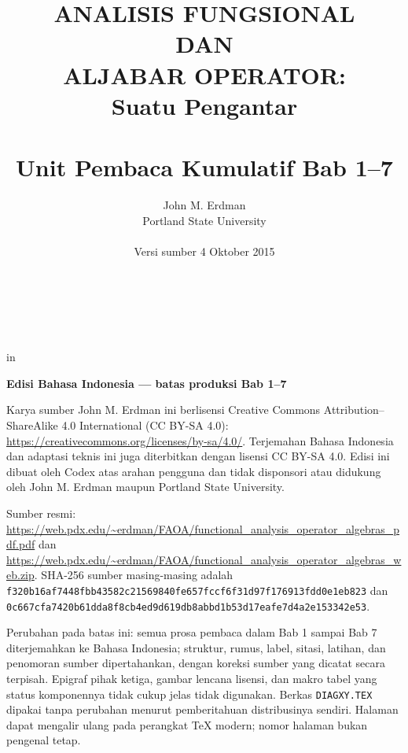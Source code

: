 \documentclass[11pt,reqno]{amsbook}
\theoremstyle{definition}
\theoremstyle{remark}
\numberwithin{equation}{section}
\begin{document}
 \frontmatter
 \title{ANALISIS FUNGSIONAL \\ DAN \\ ALJABAR OPERATOR: \\ Suatu Pengantar \\ \mbox{} \\ \large Unit Pembaca Kumulatif Bab 1--7}
 \author{John M. Erdman \\
      Portland State University \\
      \mbox{\hphantom{P}} \\
      Versi sumber 4 Oktober 2015 \\
      \mbox{\hphantom{P}} \\
      \mbox{\hphantom{P}} \\
            \mbox{\hphantom{P}} \\
                  \mbox{\hphantom{P}} }


 in


\maketitle


\begin{center}
\textbf{Edisi Bahasa Indonesia --- batas produksi Bab 1--7}
\end{center}

Karya sumber John M. Erdman ini berlisensi Creative Commons
Attribution--ShareAlike 4.0 International (CC BY-SA 4.0):
\url{https://creativecommons.org/licenses/by-sa/4.0/}.
Terjemahan Bahasa Indonesia dan adaptasi teknis ini juga diterbitkan dengan
lisensi CC BY-SA 4.0. Edisi ini dibuat oleh Codex atas arahan pengguna dan tidak
disponsori atau didukung oleh John M. Erdman maupun Portland State University.

\begin{sloppypar}
Sumber resmi:
\url{https://web.pdx.edu/~erdman/FAOA/functional_analysis_operator_algebras_pdf.pdf}
dan
\url{https://web.pdx.edu/~erdman/FAOA/functional_analysis_operator_algebras_web.zip}.
SHA-256 sumber masing-masing adalah
\texttt{f320b16af7448fbb43582c21569840fe\allowbreak657fccf6f31d97f176913fdd0e1eb823}
dan
\texttt{0c667cfa7420b61dda8f8cb4ed9d619d\allowbreak b8abbd1b53d17eafe7d4a2e153342e53}.
\end{sloppypar}

Perubahan pada batas ini: semua prosa pembaca dalam Bab 1 sampai Bab 7
diterjemahkan ke Bahasa Indonesia; struktur, rumus, label, sitasi, latihan,
dan penomoran sumber dipertahankan, dengan koreksi sumber yang dicatat secara
terpisah. Epigraf pihak ketiga, gambar lencana lisensi, dan makro tabel yang
status komponennya tidak cukup jelas tidak digunakan. Berkas
\texttt{DIAGXY.TEX} dipakai tanpa perubahan menurut pemberitahuan distribusinya
sendiri. Halaman dapat
mengalir ulang pada perangkat TeX modern; nomor halaman bukan pengenal tetap.
\end{document}
